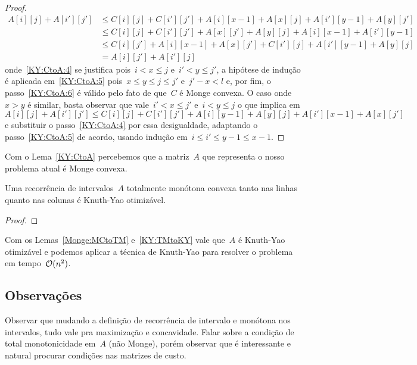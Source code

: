 \begin{proof}
\begin{align}
A[i][j] + A[i'][j'] &\leq C[i][j] + C[i'][j'] + A[i][x-1] + A[x][j] + A[i'][y-1] + A[y][j'] \label{KY:CtoA:4} \\
                    &\leq C[i][j] + C[i'][j'] + A[x][j'] + A[y][j] + A[i][x-1] + A[i'][y-1] \label{KY:CtoA:5} \\
                    &\leq C[i][j'] + A[i][x-1] + A[x][j'] + C[i'][j] + A[i'][y-1] + A[y][j] \label{KY:CtoA:6} \\
                    &= A[i][j'] + A[i'][j] \nonumber
\end{align}
onde~\eqref{KY:CtoA:4} se justifica pois~${i < x \leq j}$ e~${i' < y \leq j'}$, a hipótese de indução é aplicada em~\eqref{KY:CtoA:5} pois~${x \leq y \leq j \leq j'}$ e~${j' - x < l}$ e, por fim, o passo~\eqref{KY:CtoA:6} é válido pelo fato de que~$C$ é Monge convexa. O caso onde~${x > y}$ é similar, basta observar que vale~${i' < x \leq j'}$ e~${i < y \leq j}$ o que implica em~${A[i][j] + A[i'][j'] \leq C[i][j] + C[i'][j'] + A[i][y-1] + A[y][j] + A[i'][x-1] + A[x][j']}$ e substituir o passo~\eqref{KY:CtoA:4} por essa desigualdade, adaptando o passo~\eqref{KY:CtoA:5} de acordo, usando indução em~${i \leq i' \leq y - 1 \leq x - 1}$.
\end{proof}

Com o Lema~\ref{KY:CtoA} percebemos que a matriz~$A$ que representa o nosso problema atual é Monge convexa.

\begin{lema} \label{KY:TMtoKY}
Uma recorrência de intervalos~$A$ totalmente monótona convexa tanto nas linhas quanto nas colunas é Knuth-Yao otimizável.
\end{lema}

\begin{proof}

\end{proof}

Com os Lemas~\ref{Monge:MCtoTM} e~\ref{KY:TMtoKY} vale que~$A$ é Knuth-Yao otimizável e podemos aplicar a técnica de Knuth-Yao para resolver o problema em tempo~$\mathcal{O}(n^2)$.


\subsection{Observações} \label{KY:obs}

Observar que mudando a definição de recorrência de intervalo e monótona nos intervalos, tudo vale pra maximização e concavidade. Falar sobre a condição de total monotonicidade em~$A$ (não Monge), porém observar que é interessante e natural procurar condições nas matrizes de custo. 

